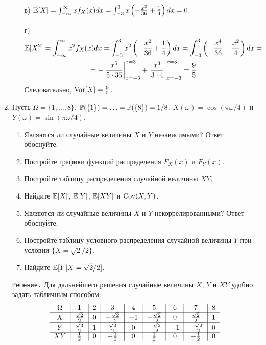 \begin{enumerate}
\begin{enumerate}
\item[в)] $\E[X] = \int_{-\infty}^{\infty}xf_X(x)dx = \int_{-3}^{3}x\left(-\frac{x^2}{36} + \frac{1}{4}\right)dx = 0$.

\item[г)]
\begin{multline*}
\E[X^2] = \int_{-\infty}^{\infty}x^2f_X(x)dx = \int_{-3}^{3}x^2\left(-\frac{x^2}{36} + \frac{1}{4}\right)dx = \int_{-3}^{3}\left(-\frac{x^4}{36} + \frac{x^2}{4}\right)dx = \\
= -\left.\frac{x^5}{5\cdot36}\right|_{x=-3}^{x=3} + \left.\frac{x^3}{3\cdot4}\right|_{x=-3}^{x=3} = \frac{9}{5}
\end{multline*}
Следовательно, $\Var[X] = \frac{9}{5}$.
\end{enumerate}
\item %

Пусть $\Omega = \{1,\ldots,8\}$, $\P(\{1\}) = \ldots = \P(\{8\}) = 1/8$, $X(\omega) = \cos(\pi\omega/4)$ и $Y(\omega) = \sin(\pi\omega/4)$.
\begin{enumerate}
  \item Являются ли случайные величины $X$ и $Y$ независимыми? Ответ обоснуйте.
  \item Постройте графики функций распределения $F_X(x)$ и $F_Y(x)$.
  \item Постройте таблицу распределения случайной величины $XY$.
  \item Найдите $\E[X]$, $\E[Y]$, $\E[XY]$ и $\Cov(X,Y)$.
  \item Являются ли случайные величины $X$ и $Y$ некоррелированными? Ответ обоснуйте.
  \item Постройте таблицу условного распределения случайной величины $Y$ при условии $\{X = \sqrt{2}/2\}$.
  \item Найдите $\E[Y|X = \sqrt{2}/2]$.
\end{enumerate}

\verb"Решение." Для дальнейшего решения случайные величины $X$, $Y$ и $XY$ удобно задать табличным способом:
\[
\begin{tabular}{c|c|c|c|c|c|c|c|c}
  $\Omega$       & $1$                      & $2$     & $3$                      & $4$     & $5$                     & $6$     & $7$                    & $8$    \\ \cline{1-9}
  $X$            & $\frac{\sqrt{2}}{2}$     & $0$     & $-\frac{\sqrt{2}}{2}$    & $-1$    & $-\frac{\sqrt{2}}{2}$   & $0$     & $\frac{\sqrt{2}}{2}$   & $1$    \\ \cline{1-9}
  $Y$            & $\frac{\sqrt{2}}{2}$     & $1$     & $\frac{\sqrt{2}}{2}$     & $0$     & $-\frac{\sqrt{2}}{2}$   & $-1$    & $-\frac{\sqrt{2}}{2}$  & $0$    \\ \cline{1-9}
  $XY$           & $\frac{1}{2}$            & $0$     & $-\frac{1}{2}$           & $0$     & $\frac{1}{2}$           & $0$     & $-\frac{1}{2}$         & $0$    \\
\end{tabular}
\]


\end{enumerate}
